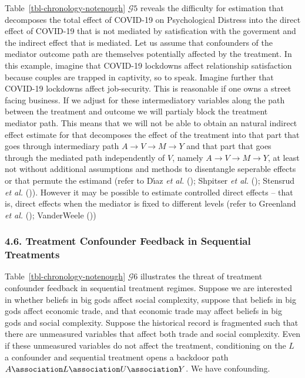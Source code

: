 \documentclass[
  single column]{article}
\begin{document}
Table~\ref{tbl-chronology-notenough} \(\mathcal{G} 5\) reveals the
difficulty for estimation that decomposes the total effect of COVID-19
on Psychological Distress into the direct effect of COVID-19 that is not
mediated by satisfication with the goverment and the indirect effect
that is mediated. Let us assume that confounders of the mediator outcome
path are themselves potentially affected by the treatment. In this
example, imagine that COVID-19 lockdowns affect relationship
satisfaction because couples are trapped in captivity, so to speak.
Imagine further that COVID-19 lockdowns affect job-security. This is
reasonable if one owns a street facing business. If we adjust for these
intermediatory variables along the path between the treatment and
outcome we will partialy block the treatment mediator path. This means
that we will not be able to obtain an natural indirect effect estimate
for that decomposes the effect of the treatment into that part that goes
through intermediary path \(A \to V \to M \to Y\) and that part that
goes through the mediated path independently of \(V\), namely
\(A \to V \to M \to Y\), at least not without additional assumptions and
methods to disentangle seperable effects or that permute the estimand
(refer to Dı́az \emph{et al.} (); Shpitser
\emph{et al.} (); Stensrud
\emph{et al.} ()). However
it may be possible to estimate controlled direct effects -- that is,
direct effects when the mediator is fixed to different levels (refer to
Greenland \emph{et al.} ();
VanderWeele ())

\subsubsection{4.6. Treatment Confounder Feedback in Sequential
Treatments}\label{treatment-confounder-feedback-in-sequential-treatments}

Table~\ref{tbl-chronology-notenough} \(\mathcal{G} 6\) illustrates the
threat of treatment confounder feedback in sequential treatment regimes.
Suppose we are interested in whether beliefs in big gods affect social
complexity, suppose that beliefs in big gods affect economic trade, and
that economic trade may affect beliefs in big gods and social
complexity. Suppose the historical record is fragmented such that there
are unmeasured variables that affect both trade and social complexity.
Even if these unmeasured variables do not affect the treatment,
conditioning on the \(L\) a confounder and sequential treatment opens a
backdoor path \(A \association L \association U \association Y\). We
have confounding.
\end{document}
